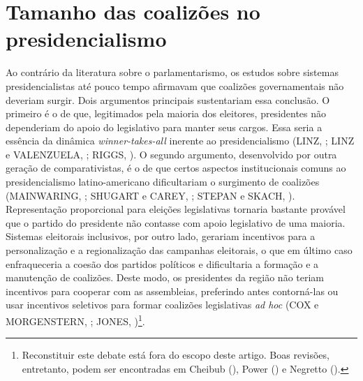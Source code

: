 \section{Tamanho das coalizões no presidencialismo}
\label{sec:revisao}

Ao contrário da literatura sobre o parlamentarismo, os estudos sobre sistemas presidencialistas até pouco tempo afirmavam que coalizões governamentais não deveriam surgir. Dois argumentos principais sustentariam essa conclusão. O primeiro é o de que, legitimados pela maioria dos eleitores, presidentes não dependeriam do apoio do legislativo para manter seus cargos. Essa seria a essência da dinâmica \textit{winner-takes-all} inerente ao presidencialismo (LINZ, \citeyear{linz1990}; LINZ e VALENZUELA, \citeyear{linz1994}; RIGGS, \citeyear{riggs1988}). O segundo argumento, desenvolvido por outra geração de comparativistas, é o de que certos aspectos institucionais comuns ao presidencialismo latino-americano dificultariam o surgimento de coalizões (MAINWARING, \citeyear{mainwaring1993}; SHUGART e CAREY, \citeyear{shugart1992}; STEPAN e SKACH, \citeyear{stepan1993}). Representação proporcional para eleições legislativas tornaria bastante provável que o partido do presidente não contasse com apoio legislativo de uma maioria. Sistemas eleitorais inclusivos, por outro lado, gerariam incentivos para a personalização e a regionalização das campanhas eleitorais, o que em último caso enfraqueceria a coesão dos partidos políticos e dificultaria a formação e a manutenção de coalizões. Deste modo, os presidentes da região não teriam incentivos para cooperar com as assembleias, preferindo antes contorná-las ou usar incentivos seletivos para formar coalizões legislativas \textit{ad hoc} (COX e MORGENSTERN, \citeyear{cox2001}; JONES, \citeyear{jones1995})\footnote{Reconstituir este debate está fora do escopo deste artigo. Boas revisões, entretanto, podem ser encontradas em Cheibub (\citeyear{cheibub2007}), Power (\citeyear{power2010}) e Negretto (\citeyear{negretto2006}).}.

